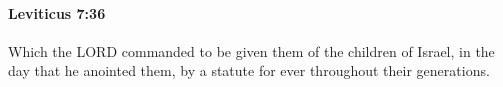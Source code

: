 
		\paragraph{Leviticus 7:36} %
			\label{LEVITICUS-7-36}

			Which the LORD commanded to be given them of the children of Israel, in the day that he anointed them, by a statute for ever throughout their generations.


